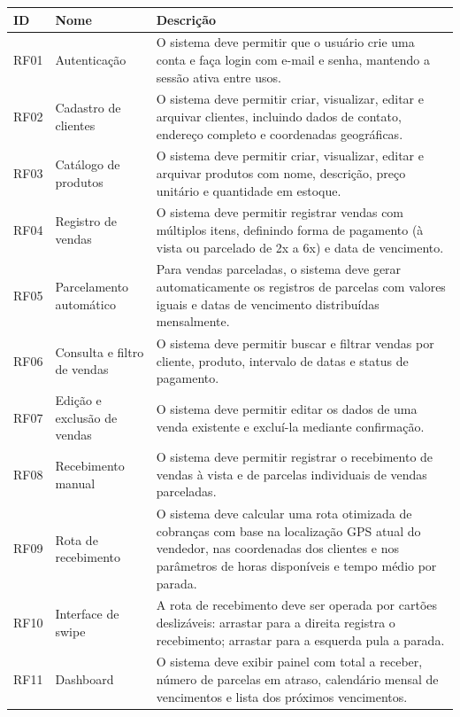 \documentclass[
	12pt,				%
	oneside,			%
	a4paper,			%
	english,			%
	brazil				%
	]{abntex2}
\begin{document}
\begin{table}[htb]
\centering
\footnotesize
\begin{tabular}{|p{1.5cm}|p{3.5cm}|p{7.5cm}|}
  \hline
  \textbf{ID} & \textbf{Nome} & \textbf{Descrição} \\
  \hline
  RF01 & Autenticação & O sistema deve permitir que o usuário crie uma conta e faça login com e-mail e senha, mantendo a sessão ativa entre usos. \\
  \hline
  RF02 & Cadastro de clientes & O sistema deve permitir criar, visualizar, editar e arquivar clientes, incluindo dados de contato, endereço completo e coordenadas geográficas. \\
  \hline
  RF03 & Catálogo de produtos & O sistema deve permitir criar, visualizar, editar e arquivar produtos com nome, descrição, preço unitário e quantidade em estoque. \\
  \hline
  RF04 & Registro de vendas & O sistema deve permitir registrar vendas com múltiplos itens, definindo forma de pagamento (à vista ou parcelado de 2x a 6x) e data de vencimento. \\
  \hline
  RF05 & Parcelamento automático & Para vendas parceladas, o sistema deve gerar automaticamente os registros de parcelas com valores iguais e datas de vencimento distribuídas mensalmente. \\
  \hline
  RF06 & Consulta e filtro de vendas & O sistema deve permitir buscar e filtrar vendas por cliente, produto, intervalo de datas e status de pagamento. \\
  \hline
  RF07 & Edição e exclusão de vendas & O sistema deve permitir editar os dados de uma venda existente e excluí-la mediante confirmação. \\
  \hline
  RF08 & Recebimento manual & O sistema deve permitir registrar o recebimento de vendas à vista e de parcelas individuais de vendas parceladas. \\
  \hline
  RF09 & Rota de recebimento & O sistema deve calcular uma rota otimizada de cobranças com base na localização GPS atual do vendedor, nas coordenadas dos clientes e nos parâmetros de horas disponíveis e tempo médio por parada. \\
  \hline
  RF10 & Interface de swipe & A rota de recebimento deve ser operada por cartões deslizáveis: arrastar para a direita registra o recebimento; arrastar para a esquerda pula a parada. \\
  \hline
  RF11 & Dashboard & O sistema deve exibir painel com total a receber, número de parcelas em atraso, calendário mensal de vencimentos e lista dos próximos vencimentos. \\

\end{tabular}
\end{table}
\end{document}
